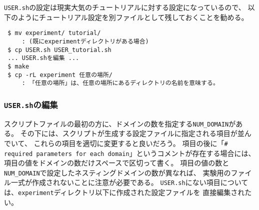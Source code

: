 \verb|USER.sh|の設定は現実大気のチュートリアルに対する設定になっているので、
以下のようにチュートリアル設定を別ファイルとして残しておくことを勧める。
\begin{verbatim}
 $ mv experiment/ tutorial/
     : (既にexperimentディレクトリがある場合)
 $ cp USER.sh USER_tutorial.sh
 ... USER.shを編集 ...
 $ make
 $ cp -rL experiment 任意の場所/
     : 「任意の場所」は、任意の場所にあるディレクトリの名前を意味する。
\end{verbatim}


\subsubsection{\texttt{USER.sh}の編集}

スクリプトファイルの最初の方に、ドメインの数を指定する\verb|NUM_DOMAIN|がある。
その下には、スクリプトが生成する設定ファイルに指定される項目が並んでいて、
これらの項目を適切に変更すると良いだろう。
項目の後に「\verb|# required parameters for each domain|」というコメントが存在する場合には、
項目の値をドメインの数だけスペースで区切って書く。
項目の値の数と\verb|NUM_DOMAIN|で設定したネスティングドメインの数が異なれば、
実験用のファイル一式が作成されないことに注意が必要である。
\verb|USER.sh|にない項目については、\verb|experiment|ディレクトリ以下に作成された設定ファイルを
直接編集されたい。
